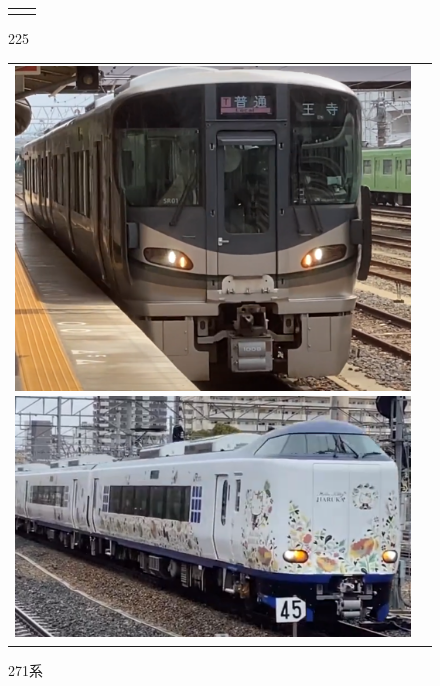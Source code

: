 \begin{figure}[htbp]
\begin{tabular}{cc}
\begin{minipage}[b]{0.15\textwidth}
		\caption{225}
		\label{fig:225}
	\end{minipage}
	\end{tabular}
\end{figure}

\begin{figure}[htbp]
	\begin{tabular}{cc}
		\begin{minipage}[b]{0.15\linewidth}
			\centering
			\includegraphics[width=\linewidth]{densya/227.png}
			\caption{227系}
			\label{fig:227}
		\end{minipage}
		\begin{minipage}[b]{0.15\textwidth}
			\includegraphics[width=\linewidth]{densya/271.png}
			\caption{271系}
			\label{fig:271}
		\end{minipage}

\end{tabular}
\end{figure}
